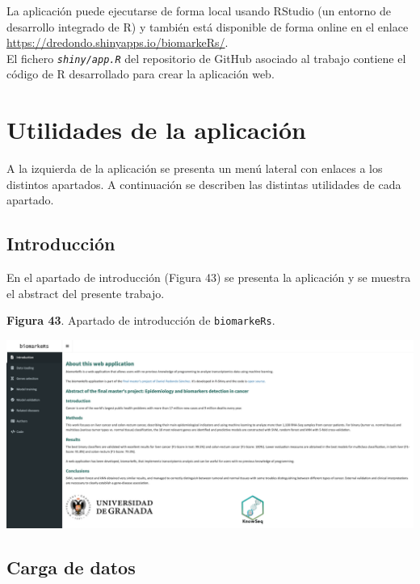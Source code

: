 La aplicación puede ejecutarse de forma local usando RStudio (un entorno de desarrollo integrado de R) \cite{RStudioTeam2020} y también está disponible de forma online en el enlace \url{https://dredondo.shinyapps.io/biomarkeRs/}.\\

El fichero \textit{\texttt{shiny/app.R}} del repositorio de GitHub asociado al trabajo \cite{Redondo-Sanchez2020} contiene el código de R desarrollado para crear la aplicación web.

\section{Utilidades de la aplicación}

A la izquierda de la aplicación se presenta un menú lateral con enlaces a los distintos apartados. A continuación se describen las distintas utilidades de cada apartado.\\

\subsection{Introducción}

En el apartado de introducción (Figura 43) se presenta la aplicación y se muestra el abstract del presente trabajo.

\newpage
\begin{center}
	\textbf{Figura 43}. Apartado de introducción de \texttt{biomarkeRs}.
\end{center}

\begin{center}
	\includegraphics[width=.90\textwidth]{figuras/43_introduction.png} \\
\end{center}

\subsection{Carga de datos}

